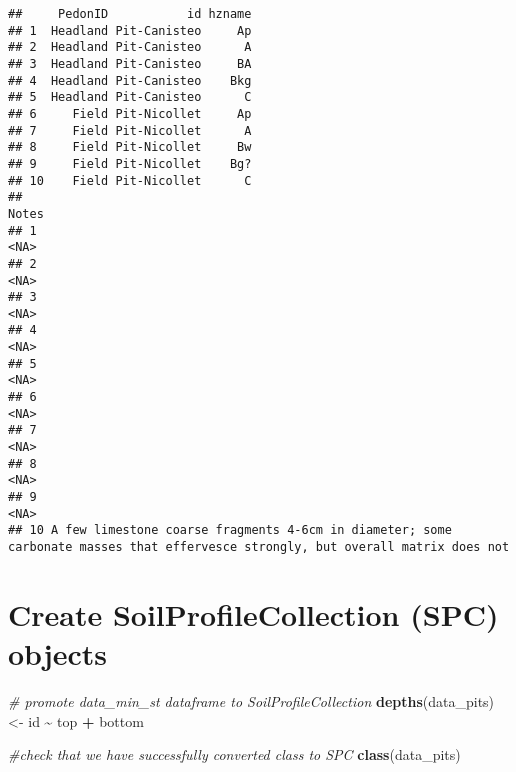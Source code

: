 \documentclass[
]{book}
\newenvironment{Shaded}{\begin{snugshade}}{\end{snugshade}}
\newcommand{\CommentTok}[1]{\textcolor[rgb]{0.56,0.35,0.01}{\textit{#1}}}
\newcommand{\KeywordTok}[1]{\textcolor[rgb]{0.13,0.29,0.53}{\textbf{#1}}}
\newcommand{\NormalTok}[1]{#1}
\newcommand{\OperatorTok}[1]{\textcolor[rgb]{0.81,0.36,0.00}{\textbf{#1}}}
\newcommand{\StringTok}[1]{\textcolor[rgb]{0.31,0.60,0.02}{#1}}
\begin{document}
\begin{verbatim}
##     PedonID           id hzname
## 1  Headland Pit-Canisteo     Ap
## 2  Headland Pit-Canisteo      A
## 3  Headland Pit-Canisteo     BA
## 4  Headland Pit-Canisteo    Bkg
## 5  Headland Pit-Canisteo      C
## 6     Field Pit-Nicollet     Ap
## 7     Field Pit-Nicollet      A
## 8     Field Pit-Nicollet     Bw
## 9     Field Pit-Nicollet    Bg?
## 10    Field Pit-Nicollet      C
##                                                                                                                              Notes
## 1                                                                                                                             <NA>
## 2                                                                                                                             <NA>
## 3                                                                                                                             <NA>
## 4                                                                                                                             <NA>
## 5                                                                                                                             <NA>
## 6                                                                                                                             <NA>
## 7                                                                                                                             <NA>
## 8                                                                                                                             <NA>
## 9                                                                                                                             <NA>
## 10 A few limestone coarse fragments 4-6cm in diameter; some carbonate masses that effervesce strongly, but overall matrix does not
\end{verbatim}

\hypertarget{create-soilprofilecollection-spc-objects}{%
\section{Create SoilProfileCollection (SPC) objects}\label{create-soilprofilecollection-spc-objects}}

\begin{Shaded}
\begin{Highlighting}[]
\CommentTok{\# promote data\_min\_st dataframe to SoilProfileCollection }
\KeywordTok{depths}\NormalTok{(data\_pits) \textless{}{-}}\StringTok{ }\NormalTok{id }\OperatorTok{\textasciitilde{}}\StringTok{ }\NormalTok{top }\OperatorTok{+}\StringTok{ }\NormalTok{bottom}

\CommentTok{\#check that we have successfully converted class to SPC}
\KeywordTok{class}\NormalTok{(data\_pits)}
\end{Highlighting}
\end{Shaded}
\end{document}
